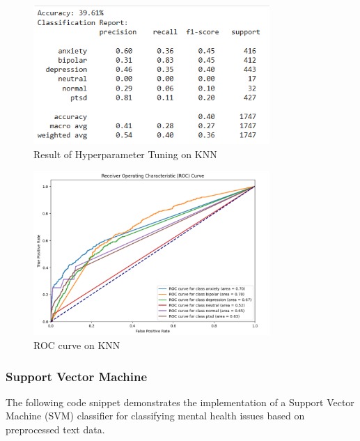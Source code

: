 \begin{figure}[h!]  
    \centering
    \includegraphics[width=0.8\textwidth]{Images/Output KNN.png}  
    \caption{Result of Hyperparameter Tuning on KNN}
    \label{HPT KNN}  %
\end{figure}

\begin{figure}[h!]  
    \centering
    \includegraphics[width=0.8\textwidth]{Images/ROC KNN.png}  
    \caption{ROC curve on KNN}
    \label{ROC KNN}  %
\end{figure}


\subsubsection{Support Vector Machine}
\noindent
The following code snippet demonstrates the implementation of a Support Vector Machine (SVM) classifier for classifying mental health issues based on preprocessed text data.

